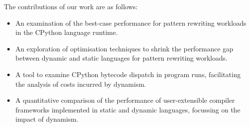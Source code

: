 The contributions of our work are as follows:

\begin{itemize}
    \item An examination of the best-case performance for pattern rewriting workloads in the CPython language runtime. %
    \item An exploration of optimisation techniques to shrink the performance gap between dynamic and static languages for pattern rewriting workloads.
    \item A tool to examine CPython bytecode dispatch in program runs, facilitating the analysis of costs incurred by dynamism.
    \item A quantitative comparison of the performance of user-extensible compiler frameworks implemented in static and dynamic languages, focussing on the impact of dynamism. %
\end{itemize}

